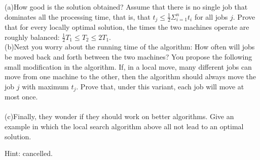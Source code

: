 \documentclass[a4paper,11pt]{article}
\begin{document}
		(a)How good is the solution obtained? Assume that there is no single job that dominates all the processing time, that is, that $t_j\leq \frac{1}{2} \Sigma^n_{i=1} t_i$ for all jobs $j$. Prove that for every locally optimal solution, the times the two machines operate are roughly balanced: $\frac{1}{2}T_1\leq T_2\leq 2T_1$.\\

		(b)Next you worry about the running time of the algorithm: How often will jobs be moved back and forth between the two machines? You propose the following small modification in the algorithm. If, in a local move, many different jobs can move from one machine to the other, then the algorithm should always move the job $j$ with maximum $t_j$. Prove that, under this variant, each job will move at most once.\\\\

		(c)Finally, they wonder if they should work on better algorithms. Give an example in which the local search algorithm above all not lead to an optimal solution.

Hint: cancelled. 
\end{document}
